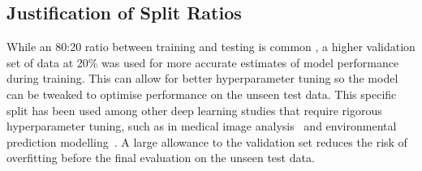 \subsection{Justification of Split Ratios}
While an 80:20 ratio between training and testing is common \citep{Talukder2025, Zhan2025}, a higher validation set of data at 20\% was used for more accurate estimates of model performance during training.
This can allow for better hyperparameter tuning so the model can be tweaked to optimise performance on the unseen test data.
This specific split has been used among other deep learning studies that require rigorous hyperparameter tuning, such as in medical image analysis~\citep{Nunes2019} and environmental prediction modelling~\citep{Lorenz2019}.
A large allowance to the validation set reduces the risk of overfitting before the final evaluation on the unseen test data.








